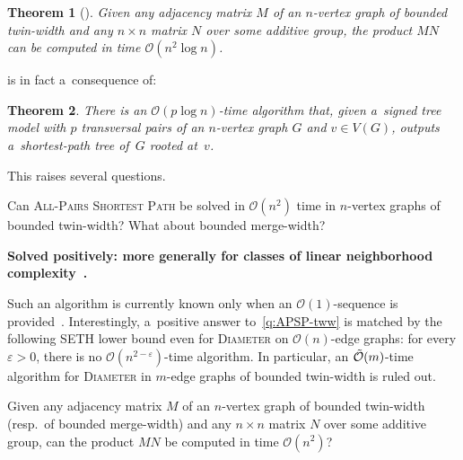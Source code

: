 \documentclass[a4paper,11pt]{article}
\newcommand{\mw}{\mathsf{mw}}
\newcommand{\Oh}{\mathcal{O}}
\newtheorem{solved-quest}[quest]{Question}
\newenvironment{solved-question}
  {\begin{solved-quest}\begin{mdframed}[style=solvedquestionstyle]}
  {\end{mdframed}\end{solved-quest}}
\newtheorem{theorem}{Theorem}
\begin{document}
\begin{theorem}[\cite{BonnetGKM26}]\label{thm:mat-mult-tww}
  Given any adjacency matrix $M$ of an $n$-vertex graph of bounded twin-width and any $n \times n$ matrix $N$ over some additive group, the product $MN$ can be computed in time $\Oh(n^2 \log n)$. 
\end{theorem}

 is in fact a~consequence of:

\begin{theorem}\label{thm:sssp-stm}
  There is an $\Oh(p \log n)$-time algorithm that, given a~signed tree model with $p$ transversal pairs of an $n$-vertex graph $G$ and $v \in V(G)$, outputs a~shortest-path tree of~$G$ rooted at~$v$.
\end{theorem}


This raises several questions.

\begin{solved-question}\label{q:APSP-tww}
  Can \textsc{All-Pairs Shortest Path} be solved in $\Oh(n^2)$ time in $n$-vertex graphs of bounded twin-width? What about bounded merge-width? 
\end{solved-question}

\textbf{Solved positively: more generally for classes of linear neighborhood complexity~\cite{BonnetDPST26}.}

\medskip

Such an algorithm is currently known only when an $\Oh(1)$-sequence is provided~\cite{Bannach24}.
Interestingly, a~positive answer to~\cref{q:APSP-tww} is matched by the following SETH lower bound even for \textsc{Diameter} on $\Oh(n)$-edge graphs: for every $\varepsilon > 0$, there is no $\Oh(n^{2-\varepsilon})$-time algorithm.
In particular, an $\Tilde{\Oh}(m)$-time algorithm for \textsc{Diameter} in $m$-edge graphs of bounded twin-width is ruled out.

\begin{solved-question}\label{q:mat-mult-tww}
  Given any adjacency matrix $M$ of an $n$-vertex graph of bounded twin-width (resp.~of bounded merge-width) and any $n \times n$ matrix $N$ over some additive group, can the product $MN$ be computed in time $\Oh(n^2)$? 
\end{solved-question}
\end{document}
